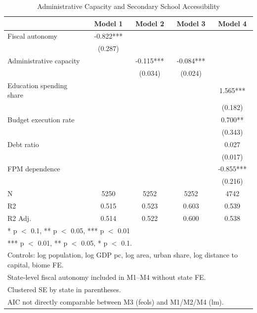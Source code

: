 \begin{table}
\centering
\caption{Administrative Capacity and Secondary School Accessibility}
\centering
\begin{tabular}[t]{lcccc}
\toprule
  & Model 1 & Model 2 & Model 3 & Model 4\\
\midrule
Fiscal autonomy & -0.822*** &  &  & \\
 & (0.287) &  &  & \\
Administrative capacity &  & -0.115*** & -0.084*** & \\
 &  & (0.034) & (0.024) & \\
Education spending share &  &  &  & 1.565***\\
 &  &  &  & (0.182)\\
Budget execution rate &  &  &  & 0.700**\\
 &  &  &  & (0.343)\\
Debt ratio &  &  &  & 0.027\\
 &  &  &  & (0.017)\\
FPM dependence &  &  &  & -0.855***\\
 &  &  &  & (0.216)\\
\midrule
N & 5250 & 5252 & 5252 & 4742\\
R2 & 0.515 & 0.523 & 0.603 & 0.539\\
R2 Adj. & 0.514 & 0.522 & 0.600 & 0.538\\
\bottomrule
\multicolumn{5}{l}{\rule{0pt}{1em}* p $<$ 0.1, ** p $<$ 0.05, *** p $<$ 0.01}\\
\multicolumn{5}{l}{\rule{0pt}{1em}*** p $<$ 0.01, ** p $<$ 0.05, * p $<$ 0.1.}\\
\multicolumn{5}{l}{\rule{0pt}{1em}Controls: log population, log GDP pc, log area, urban share, log distance to capital, biome FE.}\\
\multicolumn{5}{l}{\rule{0pt}{1em}State-level fiscal autonomy included in M1--M4 without state FE.}\\
\multicolumn{5}{l}{\rule{0pt}{1em}Clustered SE by state in parentheses.}\\
\multicolumn{5}{l}{\rule{0pt}{1em}AIC not directly comparable between M3 (feols) and M1/M2/M4 (lm).}\\
\end{tabular}
\end{table}
